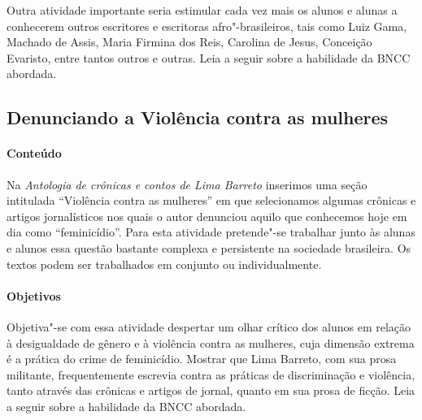 \documentclass[11pt]{extarticle}
\begin{document}
Outra atividade importante seria estimular cada vez mais os alunos e
alunas a conhecerem outros escritores e escritoras afro"-brasileiros,
tais como Luiz Gama, Machado de Assis, Maria Firmina dos Reis, Carolina
de Jesus, Conceição Evaristo, entre tantos outros e outras.
Leia a seguir sobre a habilidade da BNCC abordada.

\subsection{Denunciando a Violência contra as mulheres}




\paragraph{Conteúdo} Na \emph{Antologia de crônicas e contos de Lima
Barreto} inserimos uma seção intitulada ``Violência contra as mulheres''
em que selecionamos algumas crônicas e artigos jornalísticos nos quais o
autor denunciou aquilo que conhecemos hoje em dia como ``feminicídio''.
Para esta atividade pretende"-se trabalhar junto às alunas e alunos essa
questão bastante complexa e persistente na sociedade brasileira. Os
textos podem ser trabalhados em conjunto ou individualmente.

\paragraph{Objetivos} Objetiva"-se com essa atividade despertar um olhar
crítico dos alunos em relação à desigualdade de gênero e à violência
contra as mulheres, cuja dimensão extrema é a prática do crime de
feminicídio. Mostrar que Lima Barreto, com sua prosa militante,
frequentemente escrevia contra as práticas de discriminação e violência,
tanto através das crônicas e artigos de jornal, quanto em sua prosa de
ficção. Leia a seguir sobre a habilidade da BNCC abordada.



\end{document}
